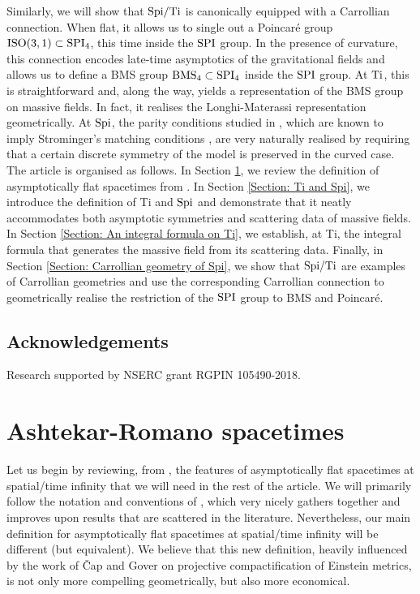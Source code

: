 \documentclass[a4paper, 10pt]{article}
\theoremstyle{remark}
\newcommand{\Ti}{\textnormal{Ti}}
\newcommand{\Spi}{\textnormal{Spi}}
\newcommand{\SPI}{\textnormal{SPI}}%
\newcommand{\BMS}{\textnormal{BMS}}
\begin{document}
Similarly, we will show that $\Spi/\Ti$ is canonically equipped with a Carrollian connection. When flat, it allows us to single out a Poincaré group $\textrm{ISO}(3,1) \subset \SPI_4$, this time inside the $\SPI$ group. In the presence of curvature, this connection encodes late-time asymptotics of the gravitational fields and allows us to define a BMS group $\BMS_4 \subset \SPI_4$ inside the $\SPI$ group. At $\Ti$, this is straightforward and, along the way, yields a representation of the BMS group on massive fields. In fact, it realises the Longhi-Materassi representation \cite{Longhi:1997zt} geometrically. At $\Spi$, the parity conditions studied in \cite{troessaert_bms4_2018,Henneaux:2018cst,Henneaux:2018gfi,Henneaux:2018mgn,Henneaux:2019yax,Fuentealba:2022xsz,AliMohamed:2021nuc,Capone:2022gme,Mohamed:2023jwv,Compere:2023qoa,Mohamed:2023ttb}, which are known to imply Strominger's matching conditions \cite{strominger_bms_2014}, are very naturally realised by requiring that a certain discrete symmetry of the model is preserved in the curved case.\\

The article is organised as follows. In Section \ref{Section: Ashtekar-Romano spacetimes}, we review the definition of asymptotically flat spacetimes from \cite{Ashtekar:1991vb}. In Section \ref{Section: Ti and Spi}, we introduce the definition of Ti and $\Spi$ and demonstrate that it neatly accommodates both asymptotic symmetries and scattering data of massive fields. In Section \ref{Section: An integral formula on Ti}, we establish, at Ti, the integral formula that generates the massive field from its scattering data. Finally, in Section \ref{Section: Carrollian geometry of Spi}, we show that $\Spi/\Ti$ are examples of Carrollian geometries and use the corresponding Carrollian connection to geometrically realise the restriction of the $\SPI$ group to BMS and Poincaré.\\


\subsection*{Acknowledgements}
Research supported by NSERC grant RGPIN 105490-2018.

\newpage
\section{Ashtekar-Romano spacetimes}\label{Section: Ashtekar-Romano spacetimes}

Let us begin by reviewing, from \cite{beig_einsteins_1982,Ashtekar:1991vb}, the features of asymptotically flat spacetimes at spatial/time infinity that we will need in the rest of the article. We will primarily follow the notation and conventions of \cite{Compere:2023qoa}, which very nicely gathers together and improves upon results that are scattered in the literature. Nevertheless, our main definition for asymptotically flat spacetimes at spatial/time infinity will be different (but equivalent). We believe that this new definition, heavily influenced by the work of Čap and Gover \cite{Cap:2014aa,Cap:2014ab} on projective compactification of Einstein metrics,  is not only more compelling geometrically, but also more economical.
\end{document}
